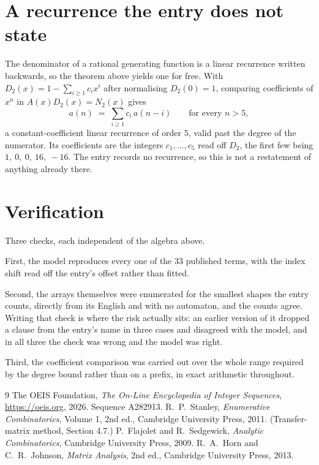 \documentclass[11pt,a4paper]{article}
\theoremstyle{plain}
\theoremstyle{definition}
\begin{document}
\section{A recurrence the entry does not state}

The denominator of a rational generating function is a linear recurrence written backwards, so
the theorem above yields one for free. With $D_2(x)=1-\sum_{i\ge1}c_ix^i$ after normalising
$D_2(0)=1$, comparing coefficients of $x^n$ in $A(x)D_2(x)=N_2(x)$ gives
\[
a(n)\;=\;\sum_{i\ge1}c_i\,a(n-i)\qquad\text{for every }n>5,
\]
a constant-coefficient linear recurrence of order $5$, valid past the degree of the
numerator. Its coefficients are the integers $c_1,\dots,c_{5}$ read off $D_2$, the first few being $1,\ 0,\ 0,\ 16,\ -16$. The entry records no recurrence, so this is not a restatement of anything
already there.

\section{Verification}

Three checks, each independent of the algebra above.

First, the model reproduces every one of the $33$ published terms, with the index shift
read off the entry's offset rather than fitted.

Second, the arrays themselves were enumerated for the smallest shapes the entry counts,
directly from its English and with no automaton, and the counts agree. Writing that check is
where the risk actually sits: an earlier version of it dropped a clause from the entry's name
in three cases and disagreed with the model, and in all three the check was wrong and the model
was right.

Third, the coefficient comparison was carried out over the whole range required by the degree
bound rather than on a prefix, in exact arithmetic throughout.

\begin{thebibliography}{9}
 The OEIS Foundation, \emph{The On-Line Encyclopedia of Integer
Sequences}, \url{https://oeis.org}, 2026. Sequence A282913.
 R.~P.~Stanley, \emph{Enumerative Combinatorics}, Volume 1, 2nd ed.,
Cambridge University Press, 2011. (Transfer-matrix method, Section 4.7.)
 P.~Flajolet and R.~Sedgewick, \emph{Analytic Combinatorics}, Cambridge
University Press, 2009.
 R.~A.~Horn and C.~R.~Johnson, \emph{Matrix Analysis}, 2nd ed., Cambridge
University Press, 2013.
\end{thebibliography}
\end{document}
